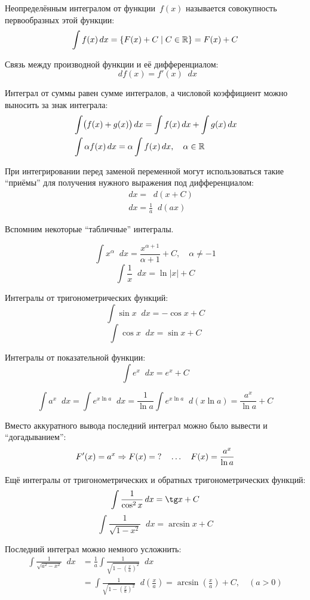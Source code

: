 \documentclass[a4paper,12pt]{article}
\newcommand{\diff}{\mathop{}\!d}
\begin{document}
  Неопределённым интегралом от функции~$f(x)$ называется совокупность первообразных этой функции:
  \[
    \int f(x) \diff x = \{F(x) + C \mid C \in \RR\} = F(x) + C
  \]

  Связь между производной функции и её дифференциалом:
  \[
    \diff f(x) = f'(x) \diff x
  \]

  Интеграл от суммы равен сумме интегралов, а числовой коэффициент можно выносить за знак интеграла:
  \[
    \begin{aligned}
      &\int\bigl(f(x) + g(x)\bigr) \diff x = \int f(x) \diff x + \int g(x) \diff x\\
      &\int \alpha f(x) \diff x = \alpha \int f(x) \diff x,\quad \alpha \in \RR
    \end{aligned}
  \]

  При интегрировании перед заменой переменной могут использоваться такие ``приёмы'' для получения нужного выражения под дифференциалом:
  \[
    \begin{aligned}
      &\diff x = \diff (x + C)\\
      &\diff x = \frac{1}{a} \diff (ax)
    \end{aligned}
  \]

  Вспомним некоторые ``табличные'' интегралы.

  \[
    \int x^{\alpha} \diff x = \frac{x^{\alpha + 1}}{\alpha + 1} + C,\quad \alpha \not= -1
  \]
  \[
    \int \frac{1}{x} \diff x = \ln |x| + C
  \]

  Интегралы от тригонометрических функций:
  \[
    \int \sin x \diff x = {-}\cos x + C  %
  \]
  \[
    \int \cos x \diff x = \sin x + C
  \]

  Интегралы от показательной функции:
  \[
    \int e^x \diff x = e^x + C
  \]

  \[
    \int a^x \diff x = \int e^{x \ln a} \diff x = \frac{1}{\ln a} \int e^{x \ln a} \diff(x \ln a) = \frac{a^x}{\ln a} + C
  \]

  Вместо аккуратного вывода последний интеграл можно было вывести и ``догадыванием'':
  \[
      F'(x) = a^x \Rightarrow F(x) = \operatorname{?} \quad \ldots \quad F(x) = \frac{a^x}{\ln a}
  \]

  Ещё интегралы от тригонометрических и обратных тригонометрических функций:
  \[
    \int \frac{1}{\cos^2 x} \diff x = \tg x + C
  \]
  \[
    \int \frac{1}{\sqrt{1 - x^2}} \diff x = \arcsin x + C
  \]

  Последний интеграл можно немного усложнить:
  \begin{equation}\label{eq:int-to-arcsin}
  \begin{split}
    \int \frac{1}{\sqrt{a^2 - x^2}} \diff x
      &= \frac{1}{a} \int \frac{1}{\sqrt{1 - \left(\frac{x}{a}\right)^2}} \diff x\\
      &= \int \frac{1}{\sqrt{1 - \left(\frac{x}{a}\right)^2}} \diff \left(\frac{x}{a}\right)
      = \arcsin\left(\frac{x}{a}\right) + C,\quad (a > 0)
  \end{split}
  \end{equation}
  
\end{document}

